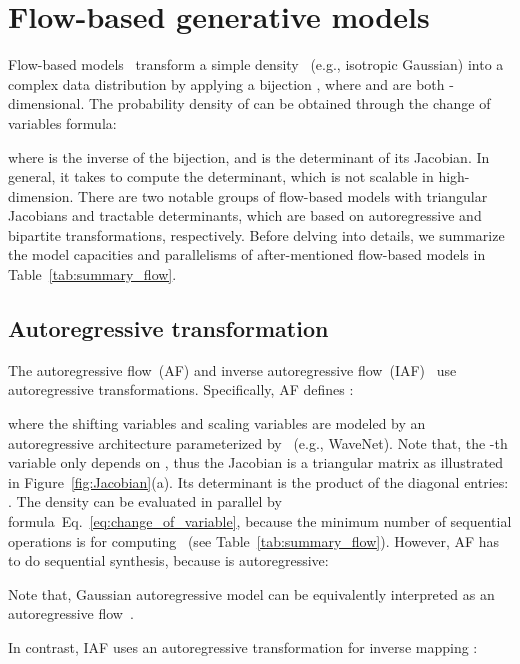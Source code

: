 \documentclass{article}
\begin{document}
\vspace{-.2em}
\section{Flow-based generative models}
\label{sec:flow_based_models}
\vspace{-.1em}
Flow-based models~\citep{dinh2014nice,dinh2016density,rezende2015variational} transform a simple density ~(e.g., isotropic Gaussian) into a complex data distribution  by applying a bijection , where  and  are both -dimensional. 
The probability density of  can be obtained through the change of variables formula:

where  is the inverse of the bijection, 
and  is the determinant of its Jacobian. 
In general, it takes  to compute the determinant, which is not scalable in high-dimension.
There are two notable groups of flow-based models with triangular Jacobians and tractable determinants, which are based on autoregressive and bipartite transformations, respectively.
Before delving into details, we summarize the model capacities and parallelisms of after-mentioned flow-based models in Table~\ref{tab:summary_flow}.


\vspace{-.2em}
\subsection{Autoregressive transformation}
\vspace{-.1em}
The autoregressive flow~(AF) and inverse autoregressive flow~(IAF)~\citep{kingma2016improved, papamakarios2017masked} use autoregressive transformations.
Specifically, AF defines :

where the shifting variables  and scaling variables  are modeled by an autoregressive architecture parameterized by ~(e.g., WaveNet).
Note that, the -th variable  only depends on , thus the Jacobian is a triangular matrix as illustrated in Figure~\ref{fig:Jacobian}(a). Its determinant is the product of the diagonal entries: .
The density  can be evaluated in parallel by  formula~Eq.~\eqref{eq:change_of_variable}, because the minimum number of sequential operations is  for computing ~(see Table~\ref{tab:summary_flow}). 
However, AF has to do sequential synthesis, because   is autoregressive: 

Note that, Gaussian autoregressive model can be equivalently interpreted as an autoregressive flow~\citep{kingma2016improved}.

In contrast, IAF uses an autoregressive transformation for inverse mapping :
\end{document}
